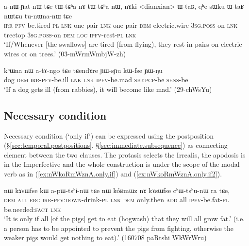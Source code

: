 \begin{exe}
\ex \label{ex:anWYatnW.tCe}
 \gll a-nɯ-ɲat-nɯ tɕe tɯ-tɕʰa nɤ tɯ-tɕʰa nɯ, nɤki <dianxian> ɯ-taʁ,  qʰe sɯku ɯ-taʁ nɯtɕu tu-nɯna-nɯ tɕe \\
 \textsc{irr}-\textsc{pfv}-be.tired-\textsc{pl} \textsc{lnk} one-pair \textsc{lnk} one-pair \textsc{dem} electric.wire \textsc{3sg}.\textsc{poss}-on \textsc{lnk} treetop \textsc{3sg}.\textsc{poss}-on \textsc{dem} \textsc{loc} \textsc{ipfv}-rest-\textsc{pl} \textsc{lnk} \\
\glt `If/Whenever  [the swallows] are tired (from flying), they rest in pairs on electric wires or on trees.' (03-mWrmWmbjW-zh)
\end{exe}


\begin{exe}
\ex \label{ex:atAngo.tCe}
 \gll kʰɯna nɯ a-tɤ-ngo tɕe tɕendɤre ɲɯ-sɲu kɯ-fse ɲɯ-ŋu \\
 dog \textsc{dem} \textsc{irr}-\textsc{pfv}-be.ill \textsc{lnk} \textsc{lnk} \textsc{ipfv}-be.mad \textsc{sbj}:\textsc{pcp}-be \textsc{sens}-be \\
\glt `If a dog gets ill (from rabbies), it will become like mad.' (29-chWsYu)
\end{exe}

 
 
\subsection{Necessary condition} \label{sec:only.if}
Necessary condition (`only if') can be expressed using the postposition  (§\ref{sec:temporal.postpositions}, §\ref{sec:immediate.subsequence}) as connecting element between the two clauses. The protasis selects the Irrealis, the apodosis is in the Imperfective and the whole construction is under the scope of the modal verb  as in  (\ref{ex:nWkoRmWznA.only.if}) and (\ref{ex:nWkoRmWznA.only.if2}).

\begin{exe}
	\ex \label{ex:nWkoRmWznA.only.if}
	\gll nɯ kɤsɯfse kɯ a-pɯ-tsʰi-nɯ tɕe nɯ 	kóʁmɯz nɤ kɤsɯfse cʰɯ-tsʰu-nɯ ra tɕe,  \\
	\textsc{dem} \textsc{all} \textsc{erg} \textsc{irr}-\textsc{pfv}:\textsc{down}-drink-\textsc{pl} \textsc{lnk} \textsc{dem}  only.then \textsc{add} all \textsc{ipfv}-be.fat-\textsc{pl} be.needed:\textsc{fact} \textsc{lnk} \\
	\glt `It is only if all [of the pigs] get to eat (hogwash) that they will all grow fat.' 	(i.e. a person has to be appointed to prevent the pigs from fighting, otherwise the weaker pigs would get nothing to eat).' (160708 paRtshi WkWrWru)
\end{exe}

